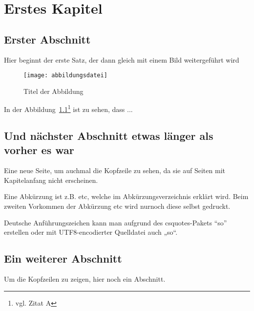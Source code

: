 \chapter{Erstes Kapitel}
\section{Erster Abschnitt}

Hier beginnt der erste Satz, der dann gleich mit einem Bild weitergeführt wird
\begin{figure}[htbp]
\centering
\texttt{[image: abbildungsdatei]} %
\caption{Titel der Abbildung} 
\label{fig:bild1}
\end{figure}

In der Abbildung~\ref{fig:bild1}\footnote{vgl. Zitat A\cite{referenzA}} %
ist zu sehen, dass ...

\newpage

\section{Und nächster Abschnitt etwas länger als vorher es war}
Eine neue Seite, um auchmal die Kopfzeile zu sehen, da sie auf Seiten mit Kapitelanfang nicht erscheinen. 

Eine Abkürzung ist z.B. \gls{etc}, welche im Abkürzungsverzeichnis erklärt wird. Beim zweiten Vorkommen der Abkürzung \gls{etc} wird nurnoch diese selbst gedruckt.

Deutsche Anführungszeichen kann man aufgrund des csquotes-Pakets \enquote{so} erstellen oder mit UTF8-encodierter Quelldatei auch „so“.

\newpage

\section{Ein weiterer Abschnitt}

Um die Kopfzeilen zu zeigen, hier noch ein Abschnitt.
